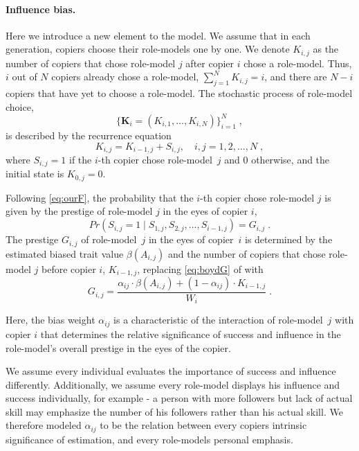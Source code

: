 \documentclass[12pt]{extarticle}
\let\vec\mathbf
\begin{document}
\paragraph{Influence bias.}
Here we introduce a new element to the model.
We assume that in each generation, copiers choose their role-models one by one.
We denote $K_{i,j}$ as the number of copiers that chose role-model $j$ after copier $i$ chose a role-model. Thus, $i$ out of $N$ copiers already chose a role-model, $\sum_{j=1}^N{K_{i,j}} = i$, and there are $N-i$ copiers that have yet to choose a role-model.
The stochastic process of role-model choice, 
\begin{equation} \label{eq:process}
\big\{\vec{K}_i = (K_{i,1}, \ldots, K_{i,N}) \big\}_{i=1}^N \;,
\end{equation}
is described by the recurrence equation
\begin{equation} \label{eq:recurrence}
K_{i,j} = K_{i-1,j} + S_{i,j}, \quad i,j=1,2,\ldots,N \;,
\end{equation}
where $S_{i,j}=1$ if the $i$-th copier chose role-model~$j$ and 0 otherwise, and the initial state is $K_{0,j}=0$.

Following \cref{eq:ourF}, the probability that the $i$-th copier chose role-model $j$ is given by the prestige of role-model $j$ in the eyes of copier $i$,
\begin{equation}\label{eq:recPrestige}
Pr(S_{i,j}=1 \mid S_{1,j},S_{2,j},...,S_{i-1,j}) = G_{i,j} \;.
\end{equation}
The prestige $G_{i,j}$ of role-model~$j$ in the eyes of copier~$i$ is determined by the estimated biased trait value $\beta(A_{i,j})$ and the number of copiers that chose role-model $j$ before copier $i$, $K_{i-1,j}$, replacing \cref{eq:boydG} of \citet{evolutionBook} with
\begin{equation}\label{eq:prestige}
G_{i,j} = \frac{\alpha_{ij} \cdot \beta(A_{i,j}) + (1-\alpha_{ij}) \cdot K_{i-1,j}}{W_i} \;.
\end{equation}

Here, the bias weight $\alpha_{ij}$ is a characteristic of the interaction of role-model~$j$ with copier $i$ that determines the relative significance of success and influence in the role-model's overall prestige in the eyes of the copier.

We assume every individual evaluates the importance of success and influence differently. Additionally, we assume every role-model displays his influence and success individually, for example - a person with more followers but lack of actual skill may emphasize the number of his followers rather than his actual skill. We therefore modeled $\alpha_{ij}$ to be the relation between every copiers intrinsic significance of estimation, and every role-models personal emphasis.
 
\end{document}
